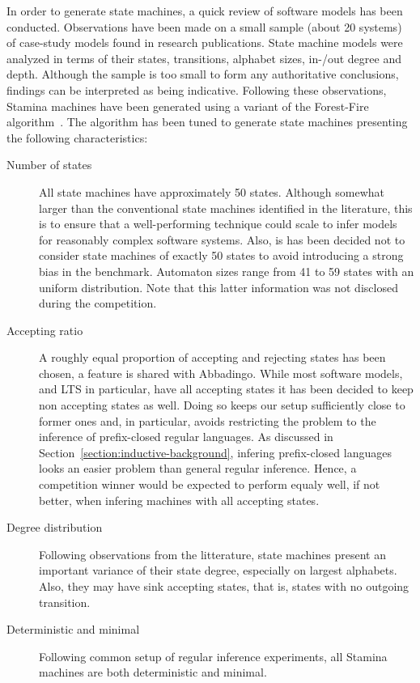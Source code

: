 In order to generate state machines, a quick review of software models has been conducted. Observations have been made on a small sample (about 20 systems) of case-study models found in research publications. State machine models were analyzed in terms of their states, transitions, alphabet sizes, in-/out degree and depth. Although the sample is too small to form any authoritative conclusions, findings can be interpreted as being indicative. Following these observations, Stamina machines have been generated using a variant of the Forest-Fire algorithm~\cite{Leskovec2007}. The algorithm has been tuned to generate state machines presenting the following characteristics:

\begin{description}

\item[Number of states] All state machines have approximately 50 states. Although somewhat larger than the conventional state machines identified in the literature, this is to ensure that a well-performing technique could scale to infer models for reasonably complex software systems. Also, is has been decided not to consider state machines of exactly 50 states to avoid introducing a strong bias in the benchmark. Automaton sizes range from 41 to 59 states with an uniform distribution. Note that this latter information was not disclosed during the competition.

\item[Accepting ratio] A roughly equal proportion of accepting and rejecting states has been chosen, a feature is shared with Abbadingo. While most software models, and LTS in particular, have all accepting states it has been decided to keep non accepting states as well. Doing so keeps our setup sufficiently close to former ones and, in particular, avoids restricting the problem to the inference of prefix-closed regular languages. As discussed in Section~\ref{section:inductive-background}, infering prefix-closed languages looks an easier problem than general regular inference. Hence, a competition winner would be expected to perform equaly well, if not better, when infering machines with all accepting states.

\item[Degree distribution] Following observations from the litterature, state machines present an important variance of their state degree, especially on largest alphabets. Also, they may have sink accepting states, that is, states with no outgoing transition.

\item[Deterministic and minimal] Following common setup of regular inference experiments, all Stamina machines are both deterministic and minimal.

\end{description}

